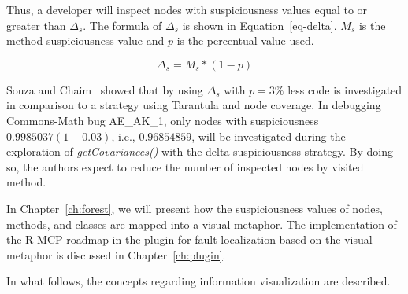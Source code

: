 Thus, a developer will inspect nodes with suspiciousness values equal to or
greater than $\Delta_{s}$. The formula of $\Delta_{s}$ is shown in
Equation~\ref{eq-delta}. $M_{s}$ is the method suspiciousness value and $p$ is
the percentual value used.

\begin{equation}
\label{eq-delta}
 \text{$\Delta_{s}$} = M_s * (1 - p)
\end{equation}

Souza and Chaim~\cite{souza13adding} showed that by using $\Delta_{s}$ with $p =
3\%$ less code is investigated in comparison to a strategy using Tarantula and
node coverage. In debugging Commons-Math bug  AE\_AK\_1, only nodes with
suspiciousness $0.9985037 (1-0.03)$, i.e., $0.96854859$, will be investigated
during the exploration of \textit{getCovariances()} with the delta suspiciousness
strategy. By doing so, the authors expect to reduce the number of inspected
nodes by visited method.

In Chapter~\ref{ch:forest}, we will present how the suspiciousness values of
nodes, methods, and classes are mapped into a visual metaphor. The
implementation of the R-MCP roadmap in the plugin for fault localization based
on the visual metaphor is discussed in Chapter~\ref{ch:plugin}.

In what follows, the concepts regarding information visualization are described.